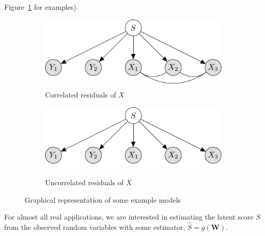 \documentclass[man, floatsintext]{apa7}
\newcommand{\mbf}[1]{\bm{#1}}
\newcommand{\bW}{\mbf{W}}
\begin{document}
  Figure~\ref{fig:PGM_example} for examples).
  \begin{figure}[t]
    \begin{subfigure}[b]{0.45\textwidth}
      \includegraphics[width=\textwidth]{fig/model_1.pdf}
      \caption{Correlated residuals of $X$}
    \end{subfigure}\hfill
    \begin{subfigure}[b]{0.45\textwidth}
      \includegraphics[width=\textwidth]{fig/model_2.pdf}
      \caption{Uncorrelated residuals of $X$}
    \end{subfigure}
    \caption{Graphical representation of some example models}
    \label{fig:PGM_example}
  \end{figure}
  For almost all real applications, we are interested in estimating the latent
  score $S$ from the observed random variables with some estimator, $\hat{S} = g
  (\bW)$.
\end{document}
